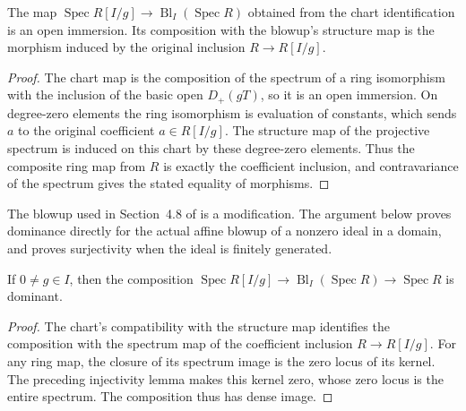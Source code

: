 \endgroup

\begingroup

\begin{lemma}
\label{lem:affine-blowup-chart-over-base}
\leanok
The map $\operatorname{Spec}R[I/g]\to\operatorname{Bl}_I(\operatorname{Spec}R)$ obtained from
the chart identification is an open immersion. Its composition with the blowup's
structure map is the morphism induced by the original inclusion $R\to R[I/g]$.
\end{lemma}
\begin{proof}
The chart map is the composition of the spectrum of a ring isomorphism with
the inclusion of the basic open $D_+(gT)$, so it is an open immersion. On
degree-zero elements the ring isomorphism is evaluation of constants, which
sends $a$ to the original coefficient $a\in R[I/g]$. The structure map of
the projective spectrum is induced on this chart by these degree-zero elements.
Thus the composite ring map from $R$ is exactly the coefficient inclusion,
and contravariance of the spectrum gives the stated equality of morphisms.
\end{proof}
\endgroup

\begingroup

The blowup used in Section~4.8 of \cite{deJong1996} is a modification.
The argument below proves dominance directly for the actual affine blowup
of a nonzero ideal in a domain, and proves surjectivity when the ideal is
finitely generated.

\begin{lemma}
\label{lem:affine-blowup-chart-dominant}
\leanok
If $0\ne g\in I$, then the composition
$\operatorname{Spec}R[I/g]\to\operatorname{Bl}_I(\operatorname{Spec}R)
\to\operatorname{Spec}R$ is dominant.
\end{lemma}
\begin{proof}
The chart's compatibility with the structure map identifies the composition
with the spectrum map of the coefficient inclusion $R\to R[I/g]$.
For any ring map, the closure of its spectrum image is the zero locus of
its kernel. The preceding injectivity lemma makes this kernel zero, whose
zero locus is the entire spectrum. The composition thus has dense image.
\end{proof}

